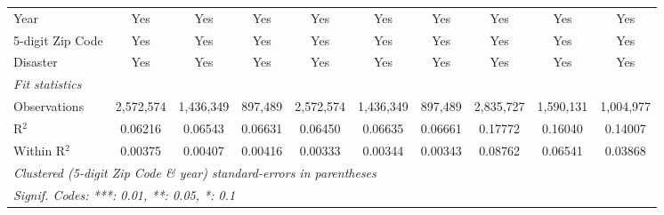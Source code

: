 \begin{tabular}{lccccccccc}
   Year                                                       & Yes            & Yes             & Yes            & Yes           & Yes            & Yes           & Yes       & Yes       & Yes\\  
   5-digit Zip Code                                           & Yes            & Yes             & Yes            & Yes           & Yes            & Yes           & Yes       & Yes       & Yes\\  
   Disaster                                                   & Yes            & Yes             & Yes            & Yes           & Yes            & Yes           & Yes       & Yes       & Yes\\  
   \midrule
   \emph{Fit statistics}\\
   Observations                                               & 2,572,574      & 1,436,349       & 897,489        & 2,572,574     & 1,436,349      & 897,489       & 2,835,727 & 1,590,131 & 1,004,977\\  
   R$^2$                                                      & 0.06216        & 0.06543         & 0.06631        & 0.06450       & 0.06635        & 0.06661       & 0.17772   & 0.16040   & 0.14007\\  
   Within R$^2$                                               & 0.00375        & 0.00407         & 0.00416        & 0.00333       & 0.00344        & 0.00343       & 0.08762   & 0.06541   & 0.03868\\  
   \midrule \midrule
   \multicolumn{10}{l}{\emph{Clustered (5-digit Zip Code \& year) standard-errors in parentheses}}\\
   \multicolumn{10}{l}{\emph{Signif. Codes: ***: 0.01, **: 0.05, *: 0.1}}\\
\end{tabular}
\par\endgroup
